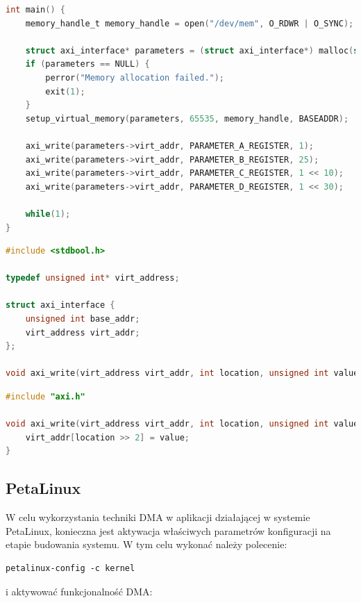 {\begin{lstlisting}[breaklines, language=C, label=lis:axi-dma-petalinux-main, caption=Obsługa modułu w trybie systemowym - \texttt{main.c}.]
int main() {
	memory_handle_t memory_handle = open("/dev/mem", O_RDWR | O_SYNC);
	
	struct axi_interface* parameters = (struct axi_interface*) malloc(sizeof(struct axi_interface));
	if (parameters == NULL) {
		perror("Memory allocation failed.");
		exit(1);
	}
	setup_virtual_memory(parameters, 65535, memory_handle, BASEADDR);
	
	axi_write(parameters->virt_addr, PARAMETER_A_REGISTER, 1);
	axi_write(parameters->virt_addr, PARAMETER_B_REGISTER, 25);
	axi_write(parameters->virt_addr, PARAMETER_C_REGISTER, 1 << 10);
	axi_write(parameters->virt_addr, PARAMETER_D_REGISTER, 1 << 30);
	
	while(1);
}
\end{lstlisting}

\begin{lstlisting}[breaklines, language=C, label=lis:axi-dma-petalinux-axi-h, caption=Obsługa modułu w trybie systemowym - \texttt{axi.h}.]
#include <stdbool.h>

typedef unsigned int* virt_address;

struct axi_interface {
	unsigned int base_addr;
	virt_address virt_addr;
};

void axi_write(virt_address virt_addr, int location, unsigned int value);
\end{lstlisting}

\begin{lstlisting}[breaklines, language=C, label=lis:axi-dma-petalinux-axi-c, caption=Obsługa modułu w trybie systemowym - \texttt{axi.c}.]
#include "axi.h"

void axi_write(virt_address virt_addr, int location, unsigned int value) {
	virt_addr[location >> 2] = value;
}
\end{lstlisting}

\subsection{PetaLinux}
\label{sec:vivado-axi-dma-petalinux}
W celu wykorzystania techniki DMA w aplikacji działającej w systemie PetaLinux, konieczna jest aktywacja właściwych parametrów konfiguracji na etapie budowania systemu. W tym celu wykonać należy polecenie:

\begin{lstlisting}[breaklines]
petalinux-config -c kernel
\end{lstlisting}

i aktywować funkcjonalność DMA:

}

